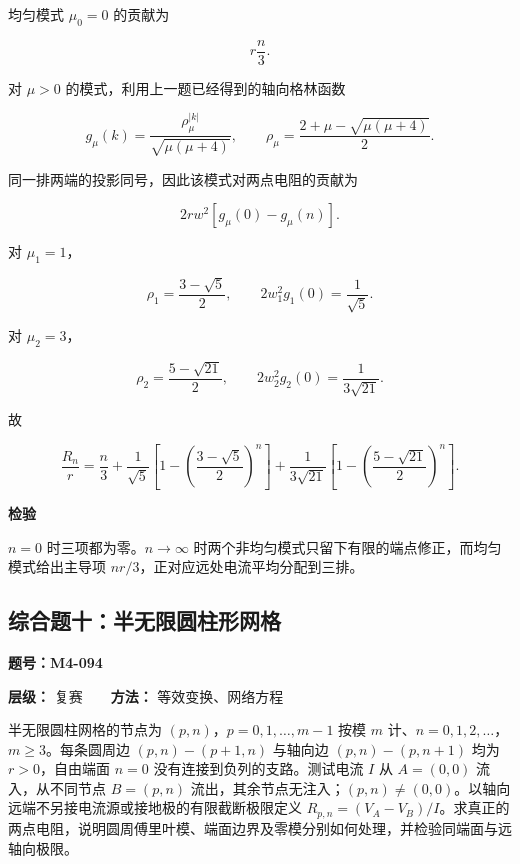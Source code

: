 均匀模式 \(\mu_0=0\) 的贡献为

\[
r\frac n3.
\]

对 \(\mu>0\) 的模式，利用上一题已经得到的轴向格林函数

\[
g_{\mu}(k)=\frac{\rho_{\mu}^{|k|}}{\sqrt{\mu(\mu+4)}},\qquad
\rho_{\mu}=\frac{2+\mu-\sqrt{\mu(\mu+4)}}2.
\]

同一排两端的投影同号，因此该模式对两点电阻的贡献为

\[
2rw^2[g_{\mu}(0)-g_{\mu}(n)].
\]

对 \(\mu_1=1\)，

\[
\rho_1=\frac{3-\sqrt5}{2},\qquad
2w_1^2g_1(0)=\frac1{\sqrt5}.
\]

对 \(\mu_2=3\)，

\[
\rho_2=\frac{5-\sqrt{21}}{2},\qquad
2w_2^2g_2(0)=\frac1{3\sqrt{21}}.
\]

故

\[
\boxed{
\frac{R_n}{r}=\frac n3+
\frac1{\sqrt5}\left[1-\left(\frac{3-\sqrt5}{2}\right)^n\right]
+\frac1{3\sqrt{21}}\left[1-\left(\frac{5-\sqrt{21}}2\right)^n\right]
}.
\]

\textbf{检验}

\(n=0\) 时三项都为零。\(n\to\infty\)
时两个非均匀模式只留下有限的端点修正，而均匀模式给出主导项
\(nr/3\)，正对应远处电流平均分配到三排。

\begingroup{}\setlength{\parskip}{1pt}\setlength{\abovedisplayskip}{3pt plus 1pt minus 1pt}\setlength{\belowdisplayskip}{3pt plus 1pt minus 1pt}\setlength{\abovedisplayshortskip}{0pt plus 1pt}\setlength{\belowdisplayshortskip}{3pt plus 1pt minus 1pt}
\par{}
\noindent\begin{minipage}{\linewidth}

\subsection{综合题十：半无限圆柱形网格}\label{m4:ux7efcux5408ux9898ux5341ux534aux65e0ux9650ux5706ux67f1ux5f62ux7f51ux683c}

\textbf{题号：M4-094}

\textbf{层级：} 复赛　　\textbf{方法：} 等效变换、网络方程

半无限圆柱网格的节点为 \((p,n)\)，\(p=0,1,\ldots,m-1\) 按模 \(m\)
计、\(n=0,1,2,\ldots\)，\(m\ge3\)。每条圆周边 \((p,n)-(p+1,n)\) 与轴向边
\((p,n)-(p,n+1)\) 均为 \(r>0\)，自由端面 \(n=0\)
没有连接到负列的支路。测试电流 \(I\) 从 \(A=(0,0)\) 流入，从不同节点
\(B=(p,n)\)
流出，其余节点无注入；\((p,n)\ne(0,0)\)。以轴向远端不另接电流源或接地极的有限截断极限定义
\(R_{p,n}=(V_A-V_B)/I\)。求真正的两点电阻，说明圆周傅里叶模、端面边界及零模分别如何处理，并检验同端面与远轴向极限。

\end{minipage}\par

